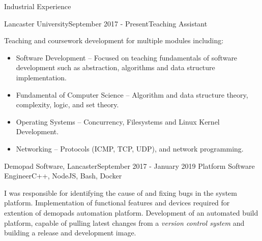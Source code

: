 \documentclass{resume} %
\begin{document}
\begin{rSection}{Industrial Experience}
	
	\begin{rSubsection}{Lancaster University}{September 2017 - Present}{Teaching Assistant}{}
		\item [] Teaching and coursework development for multiple modules including:
		\begin{itemize}
			\item Software Development -- Focused on teaching fundamentals of software development such as abstraction, algorithms and data structure implementation.
			\item Fundamental of Computer Science -- Algorithm and data structure theory, complexity, logic, and set theory.
			\item Operating Systems -- Concurrency, Filesystems and Linux Kernel Development.
			\item Networking --  Protocols (ICMP, TCP, UDP), and network programming. 
		\end{itemize}
	\end{rSubsection}
	
	\begin{rSubsection}{Demopad Software, Lancaster}{September 2017 - January 2019} {Platform Software Engineer}{C++, NodeJS, Bash, Docker}
		\item [] I was responsible for identifying the cause of and fixing bugs in the system platform. Implementation of functional features and devices required for extention of demopads automation platform. Development of an automated build platform, capable of pulling latest changes from a \textit{version control system} and building a release and development image.
	\end{rSubsection}
	

\end{rSection}
\end{document}
